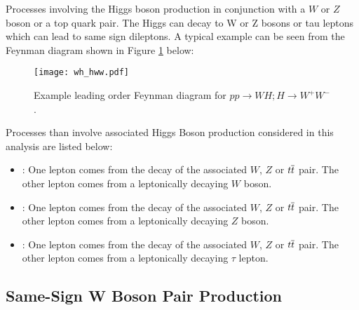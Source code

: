 Processes involving the Higgs boson production in conjunction with a $W$ or $Z$ boson or a top quark pair.
The Higgs can decay to W or Z bosons or tau leptons which can lead to same sign dileptons.
A typical example can be seen from the Feynman diagram shown in Figure \ref{fig:feyn_higgs} below:
\begin{figure}[tbhp]
\begin{center}
\texttt{[image: wh\_hww.pdf]}
\caption[Feynman diagram for \WZ]
{\label{fig:feyn_higgs} 
Example leading order Feynman diagram for $pp \to WH; H \to W^+W^-$.
}
\end{center}
\end{figure}
Processes than involve associated Higgs Boson production considered in this analysis are
listed below:
\begin{itemize}
\item \HToWW: One lepton comes from the decay of the associated $W$, $Z$ or $\relax{t}\overline{\relax{t}}$ pair.  The other lepton comes from a leptonically decaying $W$ boson.
\item \HToZZ: One lepton comes from the decay of the associated $W$, $Z$ or $\relax{t}\overline{\relax{t}}$ pair.  The other lepton comes from a leptonically decaying $Z$ boson.
\item \HToTauTau: One lepton comes from the decay of the associated $W$, $Z$ or $\relax{t}\overline{\relax{t}}$ pair.  The other lepton comes from a leptonically decaying $\tau$ lepton.
\end{itemize}

\subsection{Same-Sign W Boson Pair Production}
\label{sec:ss_rare_ssww}

